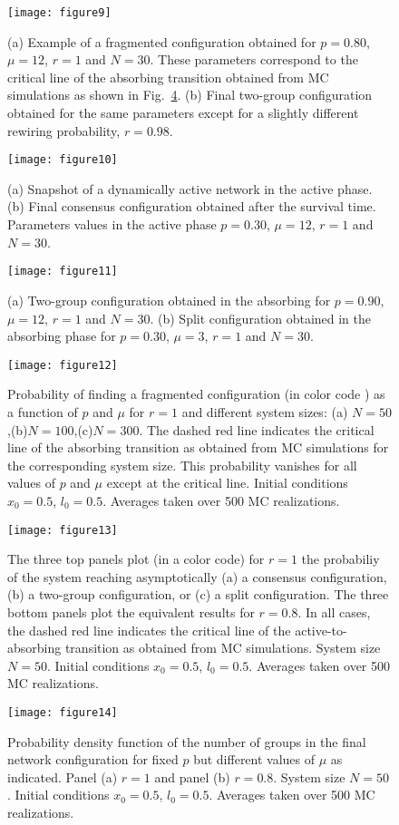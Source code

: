 \documentclass[aps,pre,notitlepage]{revtex4-1}
\begin{document}
\begin{figure}[]
\centering
 \texttt{[image: figure9]}
\caption{(a) Example of a fragmented configuration obtained for $p=0.80$, $\mu=12$, $r=1$ and $N=30$. These parameters correspond to the critical line of the absorbing transition obtained from MC simulations as shown in Fig.~\ref{Frag_PS}. (b) Final two-group configuration obtained for the same parameters except for a slightly different rewiring probability, $r=0.98$. }
\label{snapshot_frag}
\end{figure}
\begin{figure}[]
\centering
 \texttt{[image: figure10]}
\caption{(a) Snapshot of a dynamically active network in the active phase. (b) Final consensus configuration obtained after the survival time. Parameters values in the active phase $p=0.30$, $\mu=12$, $r=1$ and $N=30$.}
\label{snapshot_consus}
\end{figure}
\begin{figure}[]
\centering
 \texttt{[image: figure11]}
\caption{(a) Two-group configuration obtained in the absorbing for $p=0.90$, $\mu=12$, $r=1$ and $N=30$. (b) Split configuration obtained in the absorbing phase for $p=0.30$, $\mu=3$, $r=1$ and $N=30$.}
\label{snapshot_two_split}
\end{figure}

\begin{figure}[]
\centering
 \texttt{[image: figure12]}
\caption{Probability of finding a fragmented configuration (in color code ) as a function of $p$ and $\mu$ for $r=1$ and different system sizes: (a) $N=50$,(b)$N=100$,(c)$N=300$. The dashed red line indicates the critical line of the absorbing transition as obtained from MC simulations for the corresponding system size. This probability vanishes for all values of $p$ and $\mu$ except at the critical line. Initial conditions $x_0 = 0.5$, $l_0 = 0.5$. Averages taken over 500 MC realizations.}
\label{Frag_PS}
\end{figure}
\begin{figure}[]
\centering
 \texttt{[image: figure13]}
\caption{The three top panels plot (in a color code) for $r=1$ the probabiliy of the system reaching asymptotically (a) a consensus configuration, (b) a two-group configuration, or (c) a split configuration. The three bottom panels plot the equivalent results for $r=0.8$. In all cases, the dashed red line indicates the critical line of the active-to-absorbing transition as obtained from MC simulations. System size $N=50$. Initial conditions $x_0 = 0.5$, $l_0 = 0.5$.
Averages taken over 500 MC realizations.}
\label{Connect_PS}
\end{figure}
\begin{figure}[]
\centering
 \texttt{[image: figure14]}
\caption{Probability density function of the number of groups in the final network configuration for fixed $p$ but different values of $\mu$ as indicated. Panel (a) $r=1$ and panel (b) $r=0.8$. System size $N=50$. Initial conditions $x_0 = 0.5$, $l_0 = 0.5$.
Averages taken over 500 MC realizations.}
\label{TP_SP}
\end{figure}
\end{document}
